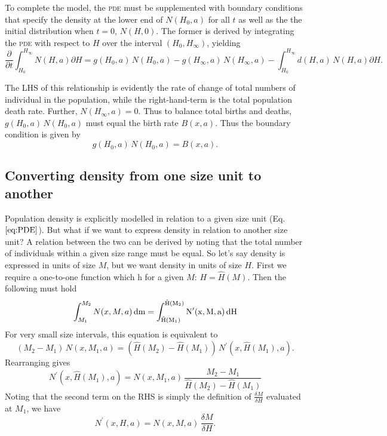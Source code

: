 \documentclass[10pt,twoside]{article}
\begin{document}
To complete the model, the \textsc{pde} must be supplemented with boundary
conditions that specify the density at the lower end of \(N(H_{0}, a)\)
for all \(t\) as well as the the initial distribution when \(t = 0\),
\(N(H,0)\). The former is derived by integrating the \textsc{pde} with respect to
\(H\) over the interval \((H_{0}, H_{\infty} )\), yielding
\begin{equation}\frac{\partial}{\partial t} \int _{H_{0} }^{H_{\infty}}N(H, a) \partial H = g(H_{0} , a) \, N(H_{0} , a) - g(H_{\infty}, a) \, N(H_{\infty}, a) - \int _{H_{0} }^{H_{\infty}}d (H, a) \, N(H, a) \partial H.
\end{equation}

The LHS of this relationship is evidently the rate of change of total
numbers of individual in the population, while the right-hand-term is
the total population death rate. Further, \(N(H_{\infty}, a) = 0\). Thus
to balance total births and deaths, \(g(H_{0} , a) \, N(H_{0} , a)\) must
equal the birth rate \(B(x, a)\). Thus the boundary condition is given
by
\begin{equation} g(H_{0} , a) \, N(H_{0} , a) = B(x, a).
\end{equation}

\subsection{Converting density from one size unit to
another}\label{converting-density-from-one-size-unit-to-another}

Population density is explicitly modelled in relation to a given size
unit (Eq. \(\ref{eq:PDE}\)). But what if we want to express density in
relation to another size unit? A relation between the two can be derived
by noting that the total number of individuals within a given size range
must be equal. So let's say density is expressed in units of size \(M\),
but we want density in units of size \(H\). First we require a
one-to-one function which h for a given \(M\): \(H = \hat{H}(M)\). Then
the following must hold
\begin{equation} \label{eq:n_conversion} \int_{M_1}^{M_2} N(x, M, a) \, \rm{d}m = \int_{\hat{H}(M_1)}^{\hat{H}(M_2)} N^\prime(x, M, a) \, {\rm d}H
\end{equation}
For very small size intervals, this equation is equivalent to
\begin{equation} \left(M_2 - M_1 \right) \, N(x, M_1, a) = \left( \hat{H}(M_2) - \hat{H}(M_1)\right) \, N^\prime(x, \hat{H}(M_1), a).
\end{equation}
Rearranging gives
\begin{equation}  N^\prime(x, \hat{H}(M_1), a) = N(x, M_1, a) \, \frac{M_2 - M_1}{\hat{H}(M_2) - \hat{H}(M_1)}
\end{equation}
Noting that the second term on the RHS is simply the definition of
\(\frac{\delta M}{\delta H}\) evaluated at \(M_1\), we have
\begin{equation} \label{eq:n_conversion2} N^\prime(x, H, a) = N(x, M, a) \, \frac{\delta M}{\delta H}.
\end{equation}

\clearpage

\end{document}
